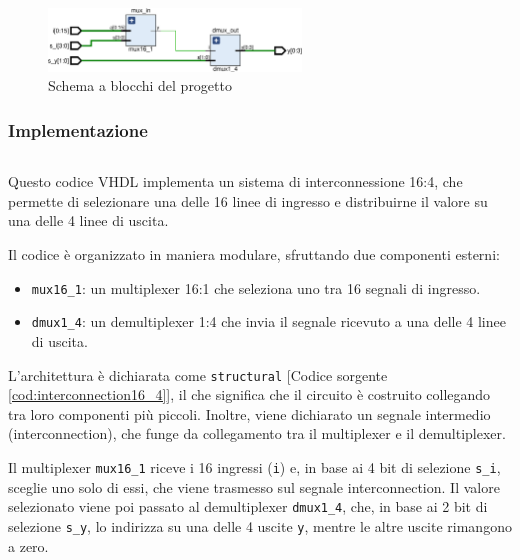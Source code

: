 \begin{figure}[h]
    \centering
    \includegraphics[width=0.6\textwidth]{img/1_2_INTERCONNECTION_16_4.pdf}
    \caption{Schema a blocchi del progetto}
    \label{fig:1_2_INTERCONNECTION_16_4}
\end{figure}

\subsubsection{Implementazione}
\begin{code}
    \inputminted{vhdl}{vhdl/interconnection16_4.vhd}
    \caption{Implementazione dell'interconnessione 16:4}
    \label{cod:interconnection16_4}
\end{code}

Questo codice VHDL implementa un sistema di interconnessione 16:4, che permette di selezionare una delle 16 linee di ingresso e distribuirne il valore su una delle 4 linee di uscita.

Il codice è organizzato in maniera modulare, sfruttando due componenti esterni:

\begin{itemize}
    \item \texttt{mux16\_1}: un multiplexer 16:1 che seleziona uno tra 16 segnali di ingresso.
    \item \texttt{dmux1\_4}: un demultiplexer 1:4 che invia il segnale ricevuto a una delle 4 linee di uscita.
\end{itemize}

L’architettura è dichiarata come \texttt{structural} [Codice sorgente \ref{cod:interconnection16_4}], il che significa che il circuito è costruito collegando tra loro componenti più piccoli. Inoltre, viene dichiarato un segnale intermedio (interconnection), che funge da collegamento tra il multiplexer e il demultiplexer.

Il multiplexer \texttt{mux16\_1} riceve i 16 ingressi (\texttt{i}) e, in base ai 4 bit di selezione \texttt{s\_i}, sceglie uno solo di essi, che viene trasmesso sul segnale interconnection. Il valore selezionato viene poi passato al demultiplexer \texttt{dmux1\_4}, che, in base ai 2 bit di selezione \texttt{s\_y}, lo indirizza su una delle 4 uscite \texttt{y}, mentre le altre uscite rimangono a zero.

